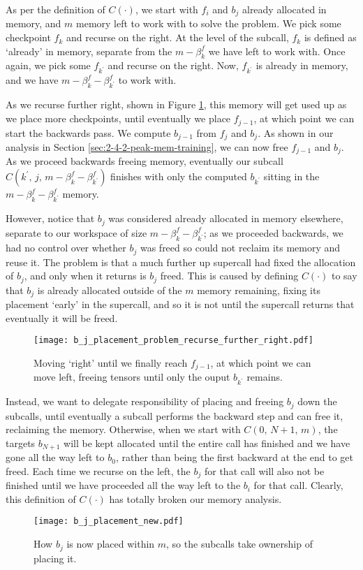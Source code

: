 As per the definition of \(C(\cdot)\), we start with \(f_i\) and \(b_j\) already allocated in memory, and \(m\) memory left to work with to solve the problem.
We pick some checkpoint \(f_k\) and recurse on the right.
At the level of the subcall, \(f_k\) is defined as `already' in memory, separate from the \(m-\beta^f_k\) we have left to work with.
Once again, we pick some \(f_{k^\prime}\) and recurse on the right.
Now, \(f_{k^\prime}\) is already in memory, and we have \(m - \beta^f_k - \beta^f_{k^\prime}\) to work with.

As we recurse further right, shown in Figure \ref{fig:3-b-j-placement-problem-right}, this memory will get used up as we place more checkpoints, until eventually we place \(f_{j-1}\), at which point we can start the backwards pass.
We compute \(b_{j-1}\) from \(f_j\) and \(b_j\).
As shown in our analysis in Section \ref{sec:2-4-2-peak-mem-training}, we can now free \(f_{j-1}\) and \(b_j\).
As we proceed backwards freeing memory, eventually our subcall \(C(k^{\prime},\,j,\,m - \beta^f_k - \beta^f_{k^\prime})\) finishes with only the computed \(b_{k^\prime}\) sitting in the \(m - \beta^f_k - \beta^f_{k^\prime}\) memory.

However, notice that \(b_j\) was considered already allocated in memory elsewhere, separate to our workspace of size \(m - \beta^f_k - \beta^f_{k^\prime}\);
as we proceeded backwards, we had no control over whether \(b_j\) was freed so could not reclaim its memory and reuse it.
The problem is that a much further up supercall had fixed the allocation of \(b_j\), and only when it returns is \(b_j\) freed.
This is caused by defining \(C(\cdot)\) to say that \(b_j\) is already allocated outside of the \(m\) memory remaining, fixing its placement `early' in the supercall, and so it is not until the supercall returns that eventually it will be freed.

\begin{figure}[t]
    \centering
    \texttt{[image: b\_j\_placement\_problem\_recurse\_further\_right.pdf]}
    \caption{Moving `right' until we finally reach \(f_{j-1}\), at which point we can move left, freeing tensors until only the ouput \(b_{k^\prime}\) remains.}
    \label{fig:3-b-j-placement-problem-right}
\end{figure}
Instead, we want to delegate responsibility of placing and freeing \(b_j\) down the subcalls, until eventually a subcall performs the backward step and can free it, reclaiming the memory.
Otherwise, when we start with \(C(0,\, N+1,\, m)\), the targets \(b_{N+1}\) will be kept allocated until the entire call has finished and we have gone all the way left to \(b_0\), rather than being the first backward at the end to get freed.
Each time we recurse on the left, the \(b_j\) for that call will also not be finished until we have proceeded all the way left to the \(b_i\) for that call.
Clearly, this definition of \(C(\cdot)\) has totally broken our memory analysis.
\begin{figure}[h]
    \centering
    \texttt{[image: b\_j\_placement\_new.pdf]}
    \caption{How \(b_j\) is now placed within \(m\), so the subcalls take ownership of placing it.}
    \label{fig:3-b-j-placement-new}
\end{figure}

